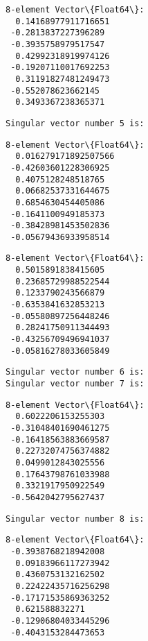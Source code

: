 \documentclass[11pt]{article}
\begin{document}
    
    \begin{Verbatim}[commandchars=\\\{\}]
8-element Vector\{Float64\}:
  0.14168977911716651
 -0.2813837227396289
 -0.3935758979517547
  0.42992318919974126
 -0.19207110017692253
  0.31191827481249473
 -0.552078623662145
  0.3493367238365371
    \end{Verbatim}

    
    \begin{Verbatim}[commandchars=\\\{\}]
Singular vector number 5 is:
    \end{Verbatim}

    
    \begin{Verbatim}[commandchars=\\\{\}]
8-element Vector\{Float64\}:
  0.016279171892507566
 -0.42603601228306925
  0.4075128248518765
  0.06682537331644675
  0.6854630454405086
 -0.1641100949185373
 -0.38428981453502836
 -0.05679436933958514
    \end{Verbatim}

    
    
    \begin{Verbatim}[commandchars=\\\{\}]
8-element Vector\{Float64\}:
  0.5015891838415605
  0.23685729988522544
  0.1233790243566879
 -0.6353841632853213
 -0.05580897256448246
  0.28241750911344493
 -0.43256709496941037
 -0.05816278033605849
    \end{Verbatim}

    
    \begin{Verbatim}[commandchars=\\\{\}]
Singular vector number 6 is:
Singular vector number 7 is:
    \end{Verbatim}

    
    \begin{Verbatim}[commandchars=\\\{\}]
8-element Vector\{Float64\}:
  0.6022206153255303
 -0.31048401690461275
 -0.16418563883669587
  0.22732074756374882
  0.0499012843025556
  0.17643798761033988
  0.3321917950922549
 -0.5642042795627437
    \end{Verbatim}

    
    \begin{Verbatim}[commandchars=\\\{\}]
Singular vector number 8 is:
    \end{Verbatim}

    
    \begin{Verbatim}[commandchars=\\\{\}]
8-element Vector\{Float64\}:
 -0.3938768218942008
  0.09183966117273942
  0.4360753132162502
  0.22422435716256298
 -0.17171535869363252
  0.621588832271
 -0.12906804033445296
 -0.4043153284473653
    \end{Verbatim}
\end{document}
